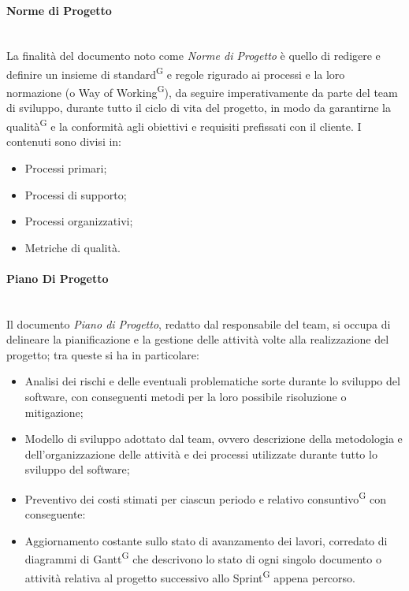 \documentclass[8pt]{article}
\newcommand{\glossterm}[1]{#1\textsuperscript{G}} %
\newcommand{\subsubsubsection}[1]{\paragraph{#1}\mbox{}\\}
\begin{document}
\subsubsubsection{Norme di Progetto}
La finalità del documento noto come \textit{Norme di Progetto} è quello di redigere e definire un insieme di \glossterm{standard} e regole rigurado ai processi e la loro normazione (o \glossterm{Way of Working}), da seguire imperativamente da parte del team di sviluppo, durante tutto il ciclo di vita del progetto, in modo da garantirne la \glossterm{qualità} e la conformità agli obiettivi e requisiti prefissati con il cliente. I contenuti sono divisi in:
\begin{itemize}
    \item Processi primari;
    \item Processi di supporto;
    \item Processi organizzativi;
    \item Metriche di qualità.
\end{itemize}

\subsubsubsection{Piano Di Progetto}
Il documento \textit{Piano di Progetto}, redatto dal responsabile del team, si occupa di delineare la pianificazione e la gestione delle attività volte alla realizzazione del progetto; tra queste si ha in particolare:
\begin{itemize}
    \item Analisi dei rischi e delle eventuali problematiche sorte durante lo sviluppo del software, con conseguenti metodi per la loro possibile risoluzione o mitigazione;
    \item Modello di sviluppo adottato dal team, ovvero descrizione della metodologia e dell'organizzazione delle attività e dei processi utilizzate durante tutto lo sviluppo del software; 
    \item Preventivo dei costi stimati per ciascun periodo e relativo \glossterm{consuntivo} con conseguente:
    \item Aggiornamento costante sullo stato di avanzamento dei lavori, corredato di diagrammi di \glossterm{Gantt} che descrivono lo stato di ogni singolo documento o attività relativa al progetto successivo allo \glossterm{Sprint} appena percorso.
\end{itemize}
\end{document}
